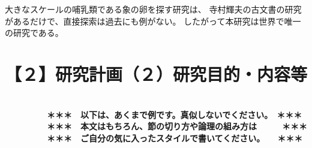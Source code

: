 \documentclass[11pt,a4j,dvipdfmx]{jarticle} 					%
\newcommand{\研究課題名}{象の卵}
\newcommand{\研究機関名}{逢坂大学}
\newcommand{\研究代表者氏名}{湯川秀樹}
\begin{document}
	大きなスケールの哺乳類である象の卵を探す研究は、
	寺村輝夫の古文書の研究があるだけで、直接探索は過去にも例がない。
	したがって本研究は世界で唯一の研究である。




\section{【２】研究計画（２）研究目的・内容等}

\JSPSInstructions		%
\textbf{\\　　　　　＊＊＊　以下は、あくまで例です。真似しないでください。　＊＊＊\\
　　　　　＊＊＊　本文はもちろん、節の切り方や論理の組み方は　　　＊＊＊\\
　　　　　＊＊＊　ご自分の気に入ったスタイルで書いてください。　　＊＊＊}
\end{document}
